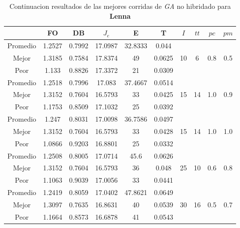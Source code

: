 \begin{table}[h!]
    \footnotesize
    \begin{center}
        \begin{tabular}{|c|c|c|c|c|c|c|c|c|c|}
        \hline
            & {\bf FO} & {\bf DB} & $J_e$ & {\bf E} & {\bf T} & $I$ & $tt$ & $pc$ & $pm$ \\
        \hline
        \hline
            Promedio  & 1.2527 & 0.7992 & 17.0987 & 32.8333 & 0.044 &  &  &  & \\
            \cline{1-6}
            Mejor & 1.3185 & 0.7584  & 17.8374 & 49 & 0.0625 & 10 & 6 & 0.8 & 0.5\\
            \cline{1-6}
            Peor & 1.133 & 0.8826  & 17.3372 & 21 & 0.0309 &  &  &  & \\
        \hline
        \hline
            Promedio  & 1.2518 & 0.7996 & 17.083 & 37.4667 & 0.0514 &  &  &  & \\
            \cline{1-6}
            Mejor & 1.3152 & 0.7604  & 16.5793 & 33 & 0.0425 & 15 & 14 & 1.0 & 0.9\\
            \cline{1-6}
            Peor & 1.1753 & 0.8509  & 17.1032 & 25 & 0.0392 &  &  &  & \\
        \hline
        \hline
            Promedio  & 1.247 & 0.8031 & 17.0098 & 36.7586 & 0.0497 &  &  &  & \\
            \cline{1-6}
            Mejor & 1.3152 & 0.7604  & 16.5793 & 33 & 0.0428 & 15 & 14 & 1.0 & 1.0\\
            \cline{1-6}
            Peor & 1.0866 & 0.9203  & 16.8801 & 25 & 0.0332 &  &  &  & \\
        \hline
        \hline
            Promedio  & 1.2508 & 0.8005 & 17.0714 & 45.6 & 0.0626 &  &  &  & \\
            \cline{1-6}
            Mejor & 1.3152 & 0.7604  & 16.5793 & 36 & 0.048 & 25 & 10 & 0.6 & 0.8\\
            \cline{1-6}
            Peor & 1.1063 & 0.9039  & 17.0056 & 33 & 0.0441 &  &  &  & \\
        \hline
        \hline
            Promedio  & 1.2419 & 0.8059 & 17.0402 & 47.8621 & 0.0649 &  &  &  & \\
            \cline{1-6}
            Mejor & 1.3097 & 0.7635  & 16.8631 & 40 & 0.0539 & 30 & 16 & 0.5 & 0.7\\
            \cline{1-6}
            Peor & 1.1664 & 0.8573  & 16.6878 & 41 & 0.0543 &  &  &  & \\
        \hline
        \end{tabular}
        \caption{Continuacion resultados de las mejores corridas de \emph{GA} no hibridado para {\bf Lenna}}
        \label{tb:tablegaalgimgc}
    \end{center}
\end{table}
